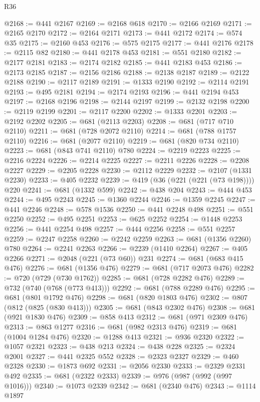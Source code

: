 \begin{lexlean}{R36}
\begin{coremodule}
{{{{{{{{{{{{{{{{{{{{{{{{{{{{{{{{{{{{{{{{{{{{{{{{{{{{{{{{{{{{{{{{{{{{{{{{{{{{{{{{{{@2168 := @441 @2167
@2169 := @2168 @618
@2170 := @2166 @2169
@2171 := @2165 @2170
@2172 := @2164 @2171
@2173 := @441 @2172
@2174 := @574 @35
@2175 := @2160 @453
@2176 := @575 @2175
@2177 := @441 @2176
@2178 := @2115 @82
@2180 := @441 @2178 @453
@2181 := @551 @2180
@2182 := @2177 @2181
@2183 := @2174 @2182
@2185 := @441 @2183 @453
@2186 := @2173 @2185
@2187 := @2156 @2186
@2188 := @2138 @2187
@2189 := @2122 @2188
@2190 := @2117 @2189
@2191 := @1333 @2190
@2192 := @2114 @2191
@2193 := @495 @2181
@2194 := @2174 @2193
@2196 := @441 @2194 @453
@2197 := @2168 @2196
@2198 := @2144 @2197
@2199 := @2132 @2198
@2200 := @2119 @2199
@2201 := @2117 @2200
@2202 := @1333 @2201
@2203 := @2192 @2202
@2205 := @681 (@2113 @2203)
@2208 := @681 (@717 @710 @2110)
@2211 := @681 (@728 @2072 @2110)
@2214 := @681 (@788 @1757 @2110)
@2216 := @681 (@2077 @2110)
@2219 := @681 (@820 @734 @2110)
@2223 := @681 (@843 @741 @2110) @780
@2224 := @2219 @2223
@2225 := @2216 @2224
@2226 := @2214 @2225
@2227 := @2211 @2226
@2228 := @2208 @2227
@2229 := @2205 @2228
@2230 := @2112 @2229
@2232 := @2107 (@1331 @2230)
@2233 := @405 @2232
@2239 := @419 (@36 (@221 (@221 (@73 @198)))) @220
@2241 := @681 (@1332 @599)
@2242 := @438 @204
@2243 := @444 @453
@2244 := @495 @2243
@2245 := @1360 @2244
@2246 := @1359 @2245
@2247 := @441 @2246
@2248 := @578 @1536
@2250 := @441 @2248 @498
@2251 := @551 @2250
@2252 := @495 @2251
@2253 := @625 @2252
@2254 := @1448 @2253
@2256 := @441 @2254 @498
@2257 := @444 @2256
@2258 := @551 @2257
@2259 := @2247 @2258
@2260 := @2242 @2259
@2263 := @681 (@1356 @2260) @780
@2264 := @2241 @2263
@2266 := @2239 (@1410 @2264)
@2267 := @405 @2266
@2271 := @2048 (@221 (@73 @60)) @231
@2274 := @681 (@683 @415 @476)
@2276 := @681 (@1356 @476)
@2279 := @681 (@717 @2073 @476)
@2282 := @720 (@729 (@730 @1762))
@2285 := @681 (@728 @2282 @476)
@2289 := @732 (@740 (@768 (@773 @413)))
@2292 := @681 (@788 @2289 @476)
@2295 := @681 (@801 @1792 @476)
@2298 := @681 (@820 @1803 @476)
@2302 := @807 (@812 (@825 (@830 @413)))
@2305 := @681 (@843 @2302 @476)
@2308 := @681 (@921 @1830 @476)
@2309 := @858 @413
@2312 := @681 (@971 @2309 @476)
@2313 := @863 @1277
@2316 := @681 (@982 @2313 @476)
@2319 := @681 (@1004 @1284 @476)
@2320 := @1288 @413
@2321 := @936 @2320
@2322 := @1057 @2321
@2323 := @438 @213
@2324 := @438 @228
@2325 := @2324 @2001
@2327 := @441 @2325 @552
@2328 := @2323 @2327
@2329 := @460 @2328
@2330 := @1873 @692
@2331 := @2056 @2330
@2333 := @2329 @2331 @492
@2335 := @681 (@2322 @2333)
@2339 := @976 (@987 (@992 (@997 @1016)))
@2340 := @1073 @2339
@2342 := @681 (@2340 @476)
@2343 := @1114 @1897
}}}}}}}}}}}}}}}}}}}}}}}}}}}}}}}}}}}}}}}}}}}}}}}}}}}}}}}}}}}}}}}}}}}}}}}}}}}}}}}}}}
\end{coremodule}
\end{lexlean}

